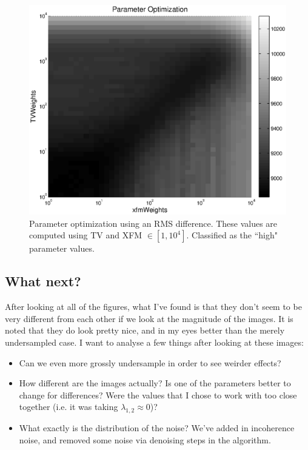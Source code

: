 \documentclass[11 pt]{article}
\begin{document}
    \begin{figure}[!ht] 
      \centering
      \vspace{0pt}
      \setlength\fboxsep{0pt}
      \setlength\fboxrule{0.5pt}
      \includegraphics[trim = {0mm 0mm 0mm 0mm},clip,scale = 0.4] {Figs/CS_Code/ParamOptimization-HighTVxfm.eps}
      \caption{Parameter optimization using an RMS difference. These values are computed using TV and XFM $\in [1,10^{4}]$. Classified as the ``high" parameter values.}
      \label{fig:lamOptHigh}
      \end{figure}

  \subsection{What next?}
    After looking at all of the figures, what I've found is that they don't seem to be very different from each other if we look at the magnitude of the images. It is noted that they do look pretty nice, and in my eyes better than the merely undersampled case. I want to analyse a few things after looking at these images:
    
    \begin{itemize}
      \item Can we even more grossly undersample in order to see weirder effects?
      
      \item How different are the images actually? Is one of the parameters better to change for differences? Were the values that I chose to work with too close together (i.e. it was taking $\lambda_{1,2} \approx 0$)?

      \item What exactly is the distribution of the noise? We've added in incoherence noise, and removed some noise via denoising steps in the algorithm.

      \end{itemize}
\end{document}

